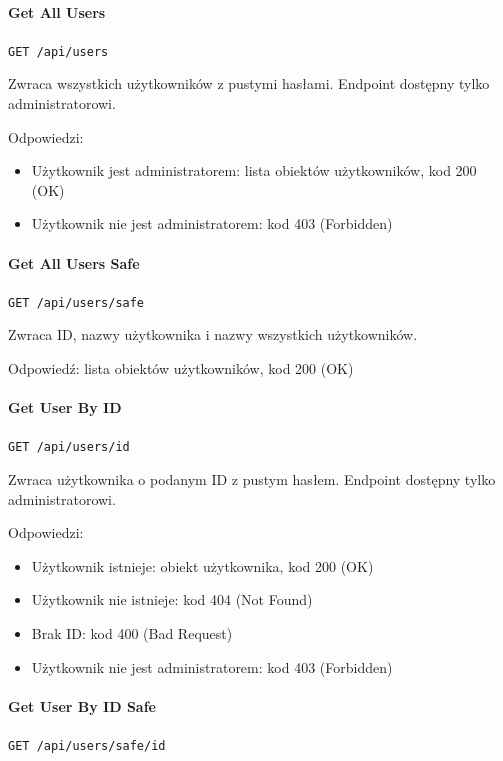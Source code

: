 \documentclass[a4paper,twoside,12pt]{book}
\begin{document}
\paragraph{Get All Users}

\texttt{GET /api/users}

Zwraca wszystkich użytkowników z pustymi hasłami. Endpoint dostępny tylko administratorowi.

Odpowiedzi: 
\begin{itemize}
	\item Użytkownik jest administratorem: lista obiektów użytkowników, kod 200 (OK) 
	\item Użytkownik nie jest administratorem: kod 403 (Forbidden)
\end{itemize}

\paragraph{Get All Users Safe}

\texttt{GET /api/users/safe}

Zwraca ID, nazwy użytkownika i nazwy wszystkich użytkowników.

Odpowiedź: lista obiektów użytkowników, kod 200 (OK)

\paragraph{Get User By ID}

\texttt{GET /api/users/{id}}

Zwraca użytkownika o podanym ID z pustym hasłem. Endpoint dostępny tylko administratorowi.

Odpowiedzi: 
\begin{itemize}
	\item Użytkownik istnieje: obiekt użytkownika, kod 200 (OK)
	\item Użytkownik nie istnieje: kod 404 (Not Found) 
	\item Brak ID: kod 400 (Bad Request) 
	\item Użytkownik nie jest administratorem: kod 403 (Forbidden)
\end{itemize}

\paragraph{Get User By ID Safe}

\texttt{GET /api/users/safe/{id}}
\end{document}
